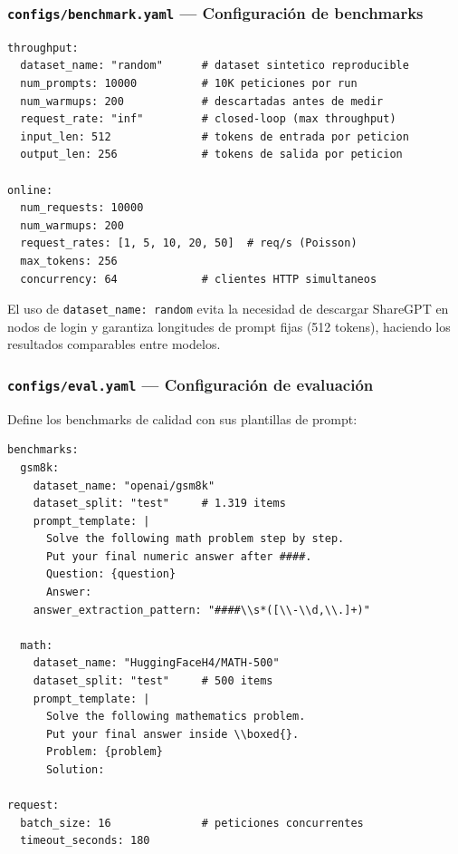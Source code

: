 \documentclass[11pt,a4paper]{article}
\begin{document}
\subsubsection{\texttt{configs/benchmark.yaml} --- Configuraci\'on de benchmarks}

\begin{lstlisting}[language={},caption={Extracto de benchmark.yaml}]
throughput:
  dataset_name: "random"      # dataset sintetico reproducible
  num_prompts: 10000          # 10K peticiones por run
  num_warmups: 200            # descartadas antes de medir
  request_rate: "inf"         # closed-loop (max throughput)
  input_len: 512              # tokens de entrada por peticion
  output_len: 256             # tokens de salida por peticion

online:
  num_requests: 10000
  num_warmups: 200
  request_rates: [1, 5, 10, 20, 50]  # req/s (Poisson)
  max_tokens: 256
  concurrency: 64             # clientes HTTP simultaneos
\end{lstlisting}

El uso de \texttt{dataset\_name: \textquotedbl random\textquotedbl} evita la necesidad de
descargar ShareGPT en nodos de login y garantiza longitudes de prompt
fijas (512 tokens), haciendo los resultados comparables entre modelos.

\subsubsection{\texttt{configs/eval.yaml} --- Configuraci\'on de evaluaci\'on}

Define los benchmarks de calidad con sus plantillas de prompt:

\begin{lstlisting}[language={},caption={Extracto de eval.yaml}]
benchmarks:
  gsm8k:
    dataset_name: "openai/gsm8k"
    dataset_split: "test"     # 1.319 items
    prompt_template: |
      Solve the following math problem step by step.
      Put your final numeric answer after ####.
      Question: {question}
      Answer:
    answer_extraction_pattern: "####\\s*([\\-\\d,\\.]+)"

  math:
    dataset_name: "HuggingFaceH4/MATH-500"
    dataset_split: "test"     # 500 items
    prompt_template: |
      Solve the following mathematics problem.
      Put your final answer inside \\boxed{}.
      Problem: {problem}
      Solution:

request:
  batch_size: 16              # peticiones concurrentes
  timeout_seconds: 180
\end{lstlisting}
\end{document}
